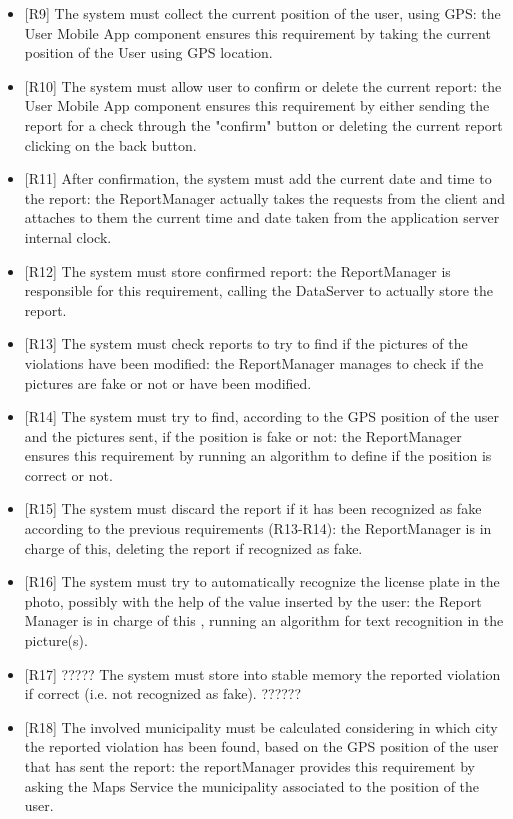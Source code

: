 \documentclass[a4paper]{report}
\begin{document}
\begin{itemize}
\item {[R9]}	\label{R9}The system must collect the current position of the user, using GPS: the User Mobile App component ensures this requirement by taking the current position of the User using GPS location.
\item {[R10]}	\label{R10}The system must allow user to confirm or delete the current report: the User Mobile App component ensures this requirement by either sending the report for a check through the "confirm" button or deleting the current report clicking on the back button.
\item {[R11]}	\label{R11}After confirmation, the system must add the current date and time to the report: the ReportManager actually takes the requests from the client and attaches to them the current time and date taken from the application server internal clock.
\item {[R12]}	\label{R12}The system must store confirmed report: the ReportManager is responsible for this requirement, calling the DataServer to actually store the report.
\item {[R13]}	\label{R13}The system must check reports to try to find if the pictures of the violations have been modified: the ReportManager manages to check if the pictures are fake or not or have been modified.
\item {[R14]}	\label{R14}The system must try to find, according to the GPS position of the user and the pictures sent, if the position is fake or not: the ReportManager ensures this requirement by running an algorithm to define if the position is correct or not. 
\item {[R15]}	\label{R15}The system must discard the report if it has been recognized as fake according to the previous requirements (R13-R14): the ReportManager is in charge of this, deleting the report if recognized as fake.
\item {[R16]}	\label{R16}The system must try to automatically recognize the license plate in the photo, possibly with the help of the value inserted by the user: the Report Manager is in charge of this , running an algorithm for text recognition in the picture(s).
\item {[R17]}	\label{R17} ????? The system must store into stable memory the reported violation if correct (i.e. not recognized as fake). ??????
\item {[R18]}	\label{R18}The involved municipality must be calculated considering in which city the reported violation has been found, based on the GPS position of the user that has sent the report: the reportManager provides this requirement by asking the Maps Service the municipality associated to the position of the user.

\end{itemize}
\end{document}
